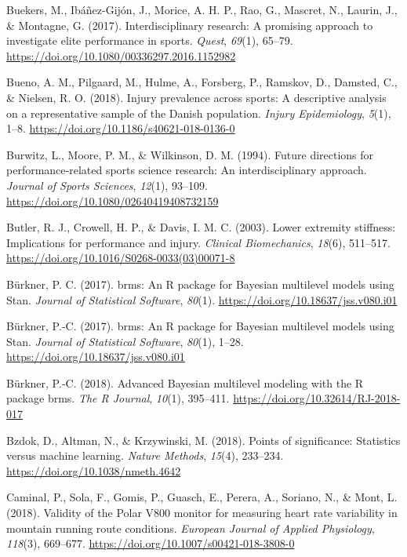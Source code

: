 \documentclass[
  english,
  man,floatsintext]{apa6}
\begin{document}
\leavevmode\hypertarget{ref-Buekers2017}{}%
Buekers, M., Ibáñez-Gijón, J., Morice, A. H. P., Rao, G., Mascret, N., Laurin, J., \& Montagne, G. (2017). Interdisciplinary research: A promising approach to investigate elite performance in sports. \emph{Quest}, \emph{69}(1), 65--79. \url{https://doi.org/10.1080/00336297.2016.1152982}

\leavevmode\hypertarget{ref-Bueno2018}{}%
Bueno, A. M., Pilgaard, M., Hulme, A., Forsberg, P., Ramskov, D., Damsted, C., \& Nielsen, R. O. (2018). Injury prevalence across sports: A descriptive analysis on a representative sample of the Danish population. \emph{Injury Epidemiology}, \emph{5}(1), 1--8. \url{https://doi.org/10.1186/s40621-018-0136-0}

\leavevmode\hypertarget{ref-Burwitz1994}{}%
Burwitz, L., Moore, P. M., \& Wilkinson, D. M. (1994). Future directions for performance‐related sports science research: An interdisciplinary approach. \emph{Journal of Sports Sciences}, \emph{12}(1), 93--109. \url{https://doi.org/10.1080/02640419408732159}

\leavevmode\hypertarget{ref-Butler2003}{}%
Butler, R. J., Crowell, H. P., \& Davis, I. M. C. (2003). Lower extremity stiffness: Implications for performance and injury. \emph{Clinical Biomechanics}, \emph{18}(6), 511--517. \url{https://doi.org/10.1016/S0268-0033(03)00071-8}

\leavevmode\hypertarget{ref-Burkner2017a}{}%
Bürkner, P. C. (2017). brms: An R package for Bayesian multilevel models using Stan. \emph{Journal of Statistical Software}, \emph{80}(1). \url{https://doi.org/10.18637/jss.v080.i01}

\leavevmode\hypertarget{ref-R-brms_a}{}%
Bürkner, P.-C. (2017). brms: An R package for Bayesian multilevel models using Stan. \emph{Journal of Statistical Software}, \emph{80}(1), 1--28. \url{https://doi.org/10.18637/jss.v080.i01}

\leavevmode\hypertarget{ref-R-brms_b}{}%
Bürkner, P.-C. (2018). Advanced Bayesian multilevel modeling with the R package brms. \emph{The R Journal}, \emph{10}(1), 395--411. \url{https://doi.org/10.32614/RJ-2018-017}

\leavevmode\hypertarget{ref-Bzdok2018}{}%
Bzdok, D., Altman, N., \& Krzywinski, M. (2018). Points of significance: Statistics versus machine learning. \emph{Nature Methods}, \emph{15}(4), 233--234. \url{https://doi.org/10.1038/nmeth.4642}

\leavevmode\hypertarget{ref-Caminal2018}{}%
Caminal, P., Sola, F., Gomis, P., Guasch, E., Perera, A., Soriano, N., \& Mont, L. (2018). Validity of the Polar V800 monitor for measuring heart rate variability in mountain running route conditions. \emph{European Journal of Applied Physiology}, \emph{118}(3), 669--677. \url{https://doi.org/10.1007/s00421-018-3808-0}
\end{document}
